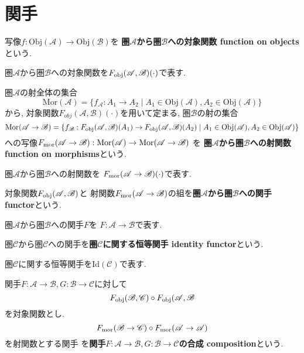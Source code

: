 \section{関手}
\begin{Def}
写像$f:\mathrm{Obj}(\mathscr{A})\rightarrow\mathrm{Obj}(\mathscr{B})$を
{\bf 圏$\mathscr{A}$から圏$\mathscr{B}$への対象関数 function on objects}という.
\end{Def}
\begin{Notation}
圏$\mathscr{A}$から圏$\mathscr{B}$への対象関数を$F_{\rm obj}(\mathscr{A},\mathscr{B})(\cdot)$で表す.
\end{Notation}
\begin{Def}
圏$\mathscr{A}$の射全体の集合\[\mathrm{Mor}(\mathscr{A})=\{f_{\mathscr{A}}:A_1\rightarrow A_2\mid A_1\in\mathrm{Obj}(\mathscr{A}),A_2\in\mathrm{Obj}(\mathscr{A})\}\]
から, 対象関数$F_{obj}(\mathscr{A},\mathscr{B})(\cdot)$を用いて定まる, 圏$\mathscr{B}$の射の集合
\[
\mathrm{Mor}(\mathscr{A}\rightarrow\mathscr{B})=\{f_{\mathscr{B}}:F_{\rm obj}(\mathscr{A},\mathscr{B})(A_1)\rightarrow
F_{\rm obj}(\mathscr{A},\mathscr{B})(A_2)\mid A_1\in\mathrm{Obj}(\mathscr{A}),A_2\in\mathrm{Obj}(\mathscr{A})\}
\]
への写像$F_{\rm mor}(\mathscr{A}\rightarrow\mathscr{B}):\mathrm{Mor}(\mathscr{A})\rightarrow\mathrm{Mor}(\mathscr{A}\rightarrow\mathscr{B})$
を
{\bf 圏$\mathscr{A}$から圏$\mathscr{B}$への射関数 function on morphisms}という.
\end{Def}
\begin{Notation}
圏$\mathscr{A}$から圏$\mathscr{B}$への射関数を
$F_{\rm mor}(\mathscr{A}\rightarrow\mathscr{B})(\cdot)$で表す.
\end{Notation}
\begin{Def}
対象関数$F_{\rm obj}(\mathscr{A},\mathscr{B})$と
射関数$F_{\rm mor}(\mathscr{A}\rightarrow\mathscr{B})$の組を{\bf 圏$\mathscr{A}$から圏$\mathscr{B}$への関手 functor}という.
\end{Def}
\begin{Notation}
圏$\mathscr{A}$から圏$\mathscr{B}$への関手$F$を
$F:\mathscr{A}\rightarrow\mathscr{B}$で表す.
\end{Notation}
\begin{Def}
圏$\mathscr{C}$から圏$\mathscr{C}$への関手を{\bf 圏$\mathscr{C}$に関する恒等関手 identity functor}という.
\end{Def}
\begin{Notation}
圏$\mathscr{C}$に関する恒等関手を$\mathrm{Id}(\mathscr{C})$で表す.
\end{Notation}
\begin{Def}
関手$F:\mathscr{A}\rightarrow\mathscr{B},G:\mathscr{B}\rightarrow\mathscr{C}$に対して
\[F_{\rm obj}(\mathscr{B},\mathscr{C})\circ F_{\rm obj}(\mathscr{A},\mathscr{B}\]
を対象関数とし.
\[F_{\rm mor}(\mathscr{B}\rightarrow\mathscr{C})\circ F_{\rm mor}(\mathscr{A}\rightarrow\mathscr{A})\]
を射関数とする関手
を{\bf 関手$F:\mathscr{A}\rightarrow\mathscr{B},G:\mathscr{B}\rightarrow\mathscr{C}$の合成 composition}という.
\end{Def}
